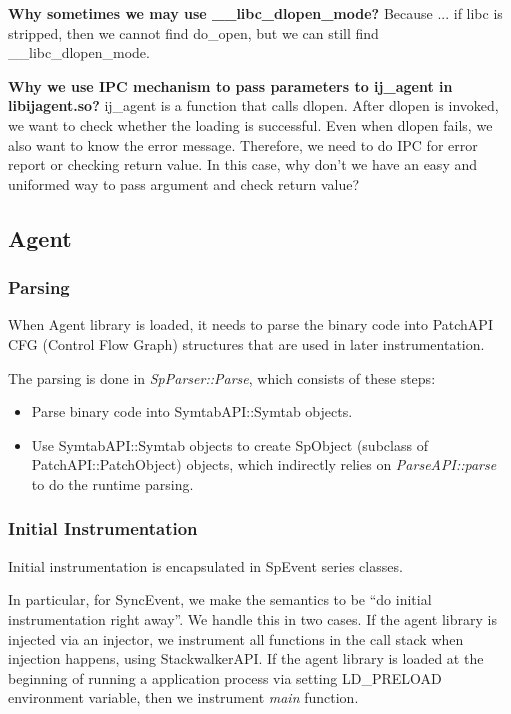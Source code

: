 \textbf{Why sometimes we may use \_\_libc\_dlopen\_mode?} Because ... if libc is
stripped, then we cannot find do\_open, but we can still find
\_\_libc\_dlopen\_mode.


\textbf{Why we use IPC mechanism to pass parameters to ij\_agent in
  libijagent.so?}  ij\_agent is a function that calls dlopen. After dlopen is
invoked, we want to check whether the loading is successful. Even when dlopen
fails, we also want to know the error message. Therefore, we need to do IPC for
error report or checking return value. In this case, why don't we have an easy
and uniformed way to pass argument and check return value?

\subsection{Agent}
\subsubsection{Parsing}

When Agent library is loaded, it needs to parse the binary code into PatchAPI
CFG (Control Flow Graph) structures that are used in later instrumentation.

The parsing is done in {\em SpParser::Parse}, which consists of these steps:
\begin{itemize}
\item Parse binary code into SymtabAPI::Symtab objects.
\item Use SymtabAPI::Symtab objects to create SpObject (subclass of
  PatchAPI::PatchObject) objects, which indirectly relies on {\em
    ParseAPI::parse} to do the runtime parsing.
\end{itemize}

\subsubsection{Initial Instrumentation}

Initial instrumentation is encapsulated in SpEvent series classes. 

In particular, for SyncEvent, we make the semantics to be ``do initial
instrumentation right away''. We handle this in two cases. If the agent library
is injected via an injector, we instrument all functions in the call stack when
injection happens, using StackwalkerAPI. If the agent library is loaded at the
beginning of running a application process via setting LD_PRELOAD environment
variable, then we instrument {\em main} function.



